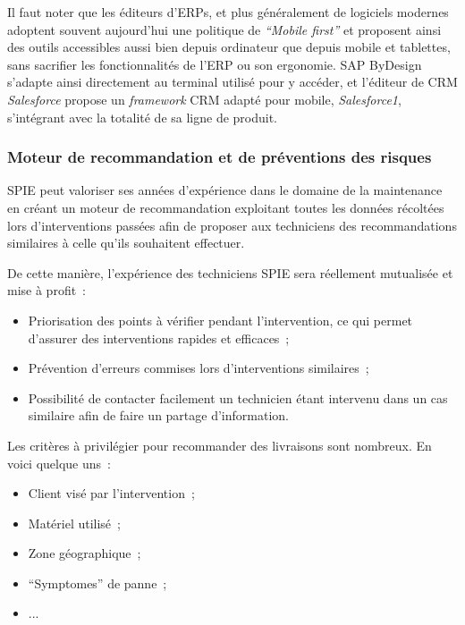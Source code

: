             Il faut noter que les éditeurs d'ERPs, et plus généralement de logiciels modernes adoptent souvent aujourd'hui une politique de \textit{``Mobile first''} et proposent ainsi des outils accessibles aussi bien depuis ordinateur que depuis mobile et tablettes, sans sacrifier les fonctionnalités de l'ERP ou son ergonomie. SAP ByDesign s'adapte ainsi directement au terminal utilisé pour y accéder, et l'éditeur de CRM \textit{Salesforce} propose un \textit{framework} CRM adapté pour mobile, \textit{Salesforce1}, s'intégrant avec la totalité de sa ligne de produit.


        \subsubsection{Moteur de recommandation et de préventions des risques}

            SPIE peut valoriser ses années d'expérience dans le domaine de la maintenance en créant un moteur de recommandation exploitant toutes les données récoltées lors d'interventions passées afin de proposer aux techniciens des recommandations similaires à celle qu'ils souhaitent effectuer.

            De cette manière, l'expérience des techniciens SPIE sera réellement mutualisée et mise à profit~:

            \begin{itemize}
                \item Priorisation des points à vérifier pendant l'intervention, ce qui permet d'assurer des interventions rapides et efficaces~;
                \item Prévention d'erreurs commises lors d'interventions similaires~;
                \item Possibilité de contacter facilement un technicien étant intervenu dans un cas similaire afin de faire un partage d'information.
            \end{itemize}

            Les critères à privilégier pour recommander des livraisons sont nombreux. En voici quelque uns~:
            \begin{itemize}
                \item Client visé par l'intervention~;
                \item Matériel utilisé~;
                \item Zone géographique~;
                \item ``Symptomes'' de panne~;
                \item ...
            \end{itemize}

